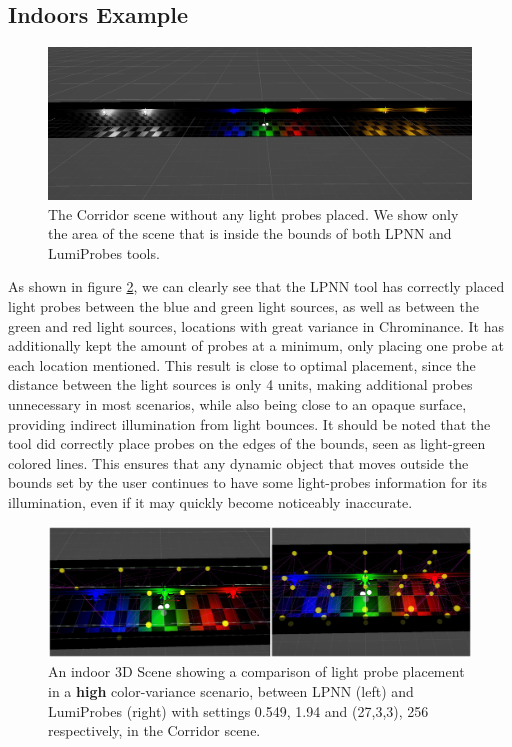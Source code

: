 \subsection{Indoors Example}

\begin{figure}[h]
	\centering
	\includegraphics[width=\linewidth]{Graphics/results/corridor.jpg}
	\caption{The Corridor scene \parencite{Corridor2021} without any light probes placed. We show only the area of the scene that is inside the bounds of both LPNN and LumiProbes tools.}
	\label{fig:corridor}
\end{figure}

As shown in figure \ref{fig:comp1}, we can clearly see that the LPNN tool has correctly placed light probes between the blue and green light sources, as well as between the green and red light sources, locations with great variance in Chrominance. It has additionally kept the amount of probes at a minimum, only placing one probe at each location mentioned. This result is close to optimal placement, since the distance between the light sources is only 4 units, making additional probes unnecessary in most scenarios, while also being close to an opaque surface, providing indirect illumination from light bounces. It should be noted that the tool did correctly place probes on the edges of the bounds, seen as light-green colored lines. This ensures that any dynamic object that moves outside the bounds set by the user continues to have some light-probes information for its illumination, even if it may quickly become noticeably inaccurate. 

\begin{figure}[h]
	\centering
	\includegraphics[width=\linewidth]{Graphics/results/concats/comparison1.png}
	\caption{An indoor 3D Scene showing a comparison of light probe placement in a \textbf{high} color-variance scenario, between LPNN (left) and LumiProbes (right) with settings 0.549, 1.94 and (27,3,3), 256 respectively, in the Corridor scene.}
	\label{fig:comp1}
\end{figure}

